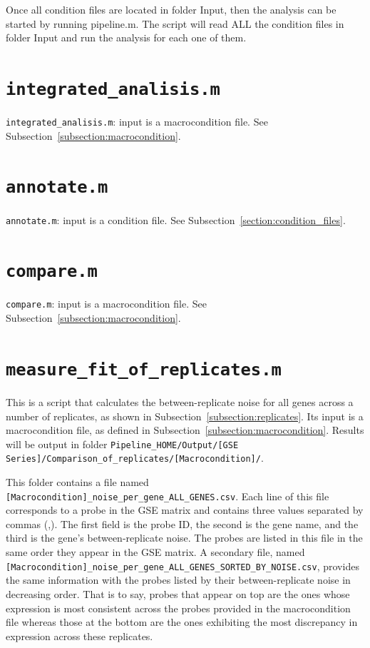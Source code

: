 \documentclass[final,letterpaper,twoside,12pt]{article}
\begin{document}
\fi

\par Once all condition files are located in folder Input, then the analysis can be started by running pipeline.m. The script will read ALL the condition files in folder Input and run the analysis for each one of them.

\section{\texttt{integrated\_analisis.m}}

\par \texttt{integrated\_analisis.m}: input is a macrocondition file. See Subsection~\ref{subsection:macrocondition}.

\section{\texttt{annotate.m}}

\par \texttt{annotate.m}: input is a condition file. See Subsection~\ref{section:condition_files}.

\section{\texttt{compare.m}}

\par \texttt{compare.m}: input is a macrocondition file. See Subsection~\ref{subsection:macrocondition}.

\section{\texttt{measure\_fit\_of\_replicates.m}}
\label{section:between_replicate_noise_m}

\par This is a script that calculates the between-replicate noise for all genes across a number of replicates, as shown in Subsection~\ref{subsection:replicates}. Its input is a macrocondition file, as defined in Subsection~\ref{subsection:macrocondition}. Results will be output in folder \texttt{Pipeline\_HOME/Output/[GSE Series]/Comparison\_of\_replicates/[Macrocondition]/}.

\par This folder contains a file named \texttt{[Macrocondition]\_noise\_per\_gene\_ALL\_GENES.csv}. Each line of this file corresponds to a probe in the GSE matrix and contains three values separated by commas (,). The first field is the probe ID, the second is the gene name, and the third is the gene's between-replicate noise. The probes are listed in this file in the same order they appear in the GSE matrix. A secondary file, named \texttt{[Macrocondition]\_noise\_per\_gene\_ALL\_GENES\_SORTED\_BY\_NOISE.csv}, provides the same information with the probes listed by their between-replicate noise in decreasing order. That is to say, probes that appear on top are the ones whose expression is most consistent across the probes provided in the macrocondition file whereas those at the bottom are the ones exhibiting the most discrepancy in expression across these replicates.
\end{document}
